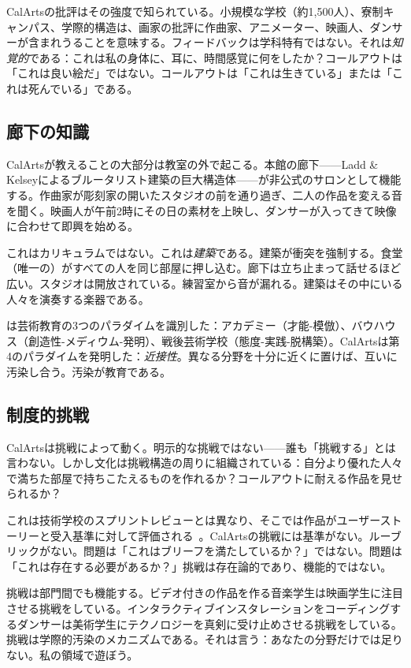 \documentclass[10pt,letterpaper,twocolumn]{article}
\begin{document}
CalArtsの批評はその強度で知られている。小規模な学校（約1,500人）、寮制キャンパス、学際的構造は、画家の批評に作曲家、アニメーター、映画人、ダンサーが含まれうることを意味する。フィードバックは学科特有ではない。それは\emph{知覚的}である：これは私の身体に、耳に、時間感覚に何をしたか？コールアウトは「これは良い絵だ」ではない。コールアウトは「これは生きている」または「これは死んでいる」である。

\subsection{廊下の知識}

CalArtsが教えることの大部分は教室の外で起こる。本館の廊下——Ladd \& Kelseyによるブルータリスト建築の巨大構造体——が非公式のサロンとして機能する。作曲家が彫刻家の開いたスタジオの前を通り過ぎ、二人の作品を変える音を聞く。映画人が午前2時にその日の素材を上映し、ダンサーが入ってきて映像に合わせて即興を始める。

これはカリキュラムではない。これは\emph{建築}である。建築が衝突を強制する。食堂（唯一の）がすべての人を同じ部屋に押し込む。廊下は立ち止まって話せるほど広い。スタジオは開放されている。練習室から音が漏れる。建築はその中にいる人々を演奏する楽器である。

\citet{deduve1994attitude}は芸術教育の3つのパラダイムを識別した：アカデミー（才能-模倣）、バウハウス（創造性-メディウム-発明）、戦後芸術学校（態度-実践-脱構築）。CalArtsは第4のパラダイムを発明した：\emph{近接性}。異なる分野を十分に近くに置けば、互いに汚染し合う。汚染が教育である。

\subsection{制度的挑戦}

CalArtsは挑戦によって動く。明示的な挑戦ではない——誰も「挑戦する」とは言わない。しかし文化は挑戦構造の周りに組織されている：自分より優れた人々で満ちた部屋で持ちこたえるものを作れるか？コールアウトに耐える作品を見せられるか？

これは技術学校のスプリントレビューとは異なり、そこでは作品がユーザーストーリーと受入基準に対して評価される~\citep{vinsel2020innovation}。CalArtsの挑戦には基準がない。ルーブリックがない。問題は「これはブリーフを満たしているか？」ではない。問題は「これは存在する必要があるか？」挑戦は存在論的であり、機能的ではない。

挑戦は部門間でも機能する。ビデオ付きの作品を作る音楽学生は映画学生に注目させる挑戦をしている。インタラクティブインスタレーションをコーディングするダンサーは美術学生にテクノロジーを真剣に受け止めさせる挑戦をしている。挑戦は学際的汚染のメカニズムである。それは言う：あなたの分野だけでは足りない。私の領域で遊ぼう。
\end{document}

